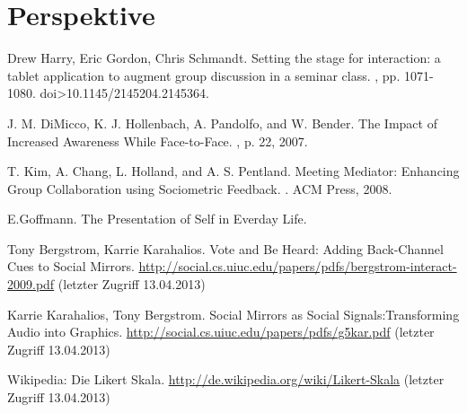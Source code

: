 \documentclass{seminarvorlage}
\begin{document}
\section{Perspektive}
% 

\begin{thebibliography}{9}

Drew Harry, Eric Gordon, Chris Schmandt.
\newblock Setting the stage for interaction: a tablet application to augment group discussion in a seminar class. 
, pp. 1071-1080. doi>10.1145/2145204.2145364. 

J. M. DiMicco, K. J. Hollenbach, A. Pandolfo, and W. Bender.
\newblock The Impact of Increased Awareness While Face-to-Face.
, p. 22, 2007.

T. Kim, A. Chang, L. Holland, and A. S. Pentland.
\newblock Meeting Mediator: Enhancing Group Collaboration using Sociometric Feedback. 
. ACM Press, 2008.

E.Goffmann.
\newblock The Presentation of Self in Everday Life.

Tony Bergstrom, Karrie Karahalios. 
\newblock Vote and Be Heard: Adding Back-Channel Cues to Social Mirrors.
 \url {http://social.cs.uiuc.edu/papers/pdfs/bergstrom-interact-2009.pdf} (letzter Zugriff 13.04.2013)

Karrie Karahalios, Tony Bergstrom. 
\newblock Social Mirrors as Social Signals:Transforming Audio into Graphics.
 \url {http://social.cs.uiuc.edu/papers/pdfs/g5kar.pdf} (letzter Zugriff 13.04.2013)


Wikipedia: Die Likert Skala.
\newblock \url {http://de.wikipedia.org/wiki/Likert-Skala} (letzter Zugriff 13.04.2013)

\end{thebibliography}
\end{document}
